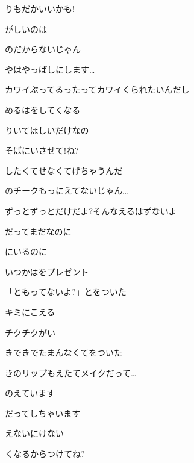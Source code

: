 \documentclass[14pt]{ltjsarticle}
\begin{document}
{  りもだかいいかも!
  \jisho{}

  がしいのは
  \jisho{}

  のだからないじゃん
  \jisho{}

\item
  やはやっぱしにします…
  \jisho{}

  カワイぶってるったってカワイくられたいんだし
  \jisho{}

  めるはをしてくなる
  \jisho{}

  りいてほしいだけなの
  \jisho{}

  そばにいさせて!ね?
  \jisho{}

\item
  したくてせなくてげちゃうんだ
  \jisho{}

  のチークもっにえてないじゃん…
  \jisho{}

  ずっとずっとだけだよ?そんなえるはずないよ
  \jisho{}

  だってまだなのに
  \jisho{}

  にいるのに
  \jisho{}

  いつかはをプレゼント
  \jisho{}

\item
  「ともってないよ?」とをついた
  \jisho{}

  キミにこえる
  \jisho{}

  チクチクがい
  \jisho{}

\item
  きできでたまんなくてをついた
  \jisho{}

  きのリップもえたてメイクだって…
  \jisho{}

  のえています
  \jisho{}

  だってしちゃいます
  \jisho{}

  えないにけない
  \jisho{}

  くなるからつけてね?
  \jisho{}

  
}
\end{document}
